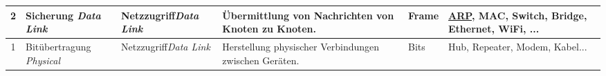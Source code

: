 \begin{tabular}{c|m{2.6cm}||m{2cm}||m{4.6cm}|m{2.5cm}|m{2cm}}
		\rowcolor{Gray!15}2      & Sicherung \newline \textit{Data Link}      & Netzzugriff\newline\textit{Data Link} & Übermittlung von Nachrichten von Knoten zu Knoten.                                                              & Frame                                     & \underline{\acrshort{ARP}}, \acrshort{MAC}, Switch, Bridge, Ethernet, \acrshort{WiFi}, ...      \\\midrule
		\rowcolor{Gray!25}1      & Bitübertragung \newline \textit{Physical}  & Netzzugriff\newline\textit{Data Link} & Herstellung physischer Verbindungen zwischen Geräten.                                                           & Bits                                      & Hub, Repeater, Modem, Kabel...        \\
	\end{tabular}
